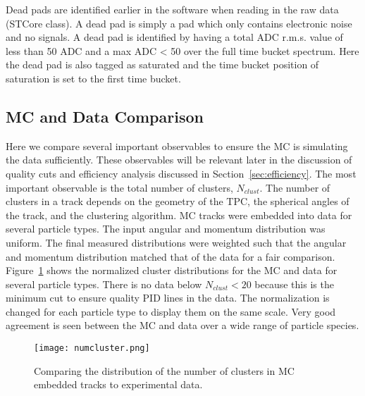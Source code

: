 Dead pads are identified earlier in the software when reading in the raw data (STCore class). A dead pad is simply a pad which only contains electronic noise and no signals. A dead pad is identified by having a total ADC r.m.s. value  of less than 50 ADC and a max ADC < 50 over the full time bucket spectrum. Here the dead pad is also tagged as saturated and the time bucket position of saturation is set to the first time bucket. 



\subsection{MC and Data Comparison}
\label{sec:mccomparison}
Here we compare several important observables to ensure the MC is simulating the data sufficiently. These observables will be relevant later in the discussion of quality cuts and efficiency analysis discussed in Section~\ref{sec:efficiency}. The most important observable is the total number of clusters, $N_{clust}$. The number of clusters in a track depends on the geometry of the TPC, the spherical angles of the track, and the clustering algorithm. MC tracks were embedded into data for several particle types. The input angular and momentum distribution was uniform. The final measured distributions were weighted such that the angular and momentum distribution matched that of the data for a fair comparison. Figure~\ref{fig:clustcomp} shows the normalized cluster distributions for the MC and data for several particle types. There is no data below $N_{clust} < 20$ because this is the minimum cut to ensure quality PID lines in the data. The normalization is changed for each particle type to display them on the same scale. Very good agreement is seen between the MC and data over a wide range of particle species. 

\begin{figure}[!hbt]
\texttt{[image: numcluster.png]}
\caption{Comparing the distribution of the number of clusters in MC embedded tracks to experimental data.}
\label{fig:clustcomp}
\end{figure}

